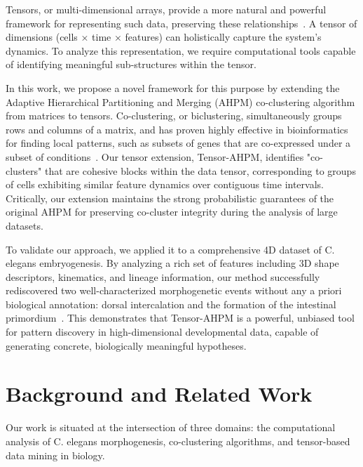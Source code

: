 \documentclass[unnumsec,webpdf,contemporary,large,namedate]{oup-authoring-template}%
\theoremstyle{thmstyleone}%
\theoremstyle{thmstyletwo}%
\theoremstyle{thmstylethree}%
\begin{document}
Tensors, or multi-dimensional arrays, provide a more natural and powerful framework for representing such data, preserving these relationships~\citep{sun2008IncrementalTensorAnalysis}. A tensor of dimensions (cells × time × features) can holistically capture the system's dynamics. To analyze this representation, we require computational tools capable of identifying meaningful sub-structures within the tensor.

In this work, we propose a novel framework for this purpose by extending the Adaptive Hierarchical Partitioning and Merging (AHPM) co-clustering algorithm from matrices to tensors. Co-clustering, or biclustering, simultaneously groups rows and columns of a matrix, and has proven highly effective in bioinformatics for finding local patterns, such as subsets of genes that are co-expressed under a subset of conditions~\citep{zapala2006MultivariateRegressionAnalysis}. Our tensor extension, Tensor-AHPM, identifies "co-clusters" that are cohesive blocks within the data tensor, corresponding to groups of cells exhibiting similar feature dynamics over contiguous time intervals. Critically, our extension maintains the strong probabilistic guarantees of the original AHPM for preserving co-cluster integrity during the analysis of large datasets.

To validate our approach, we applied it to a comprehensive 4D dataset of C. elegans embryogenesis. By analyzing a rich set of features including 3D shape descriptors, kinematics, and lineage information, our method successfully rediscovered two well-characterized morphogenetic events without any a priori biological annotation: dorsal intercalation and the formation of the intestinal primordium~\citep{bao2006AutomatedCellLineage,kaletta1997BinarySpecificationEmbryonic,artal-sanz2006CaenorhabditisElegansVersatile,sato2015LeftRightAsymmetric,stoeckius2009LargescaleSortingElegans}. This demonstrates that Tensor-AHPM is a powerful, unbiased tool for pattern discovery in high-dimensional developmental data, capable of generating concrete, biologically meaningful hypotheses.

\section{Background and Related Work}

Our work is situated at the intersection of three domains: the computational analysis of C. elegans morphogenesis, co-clustering algorithms, and tensor-based data mining in biology.
\end{document}
